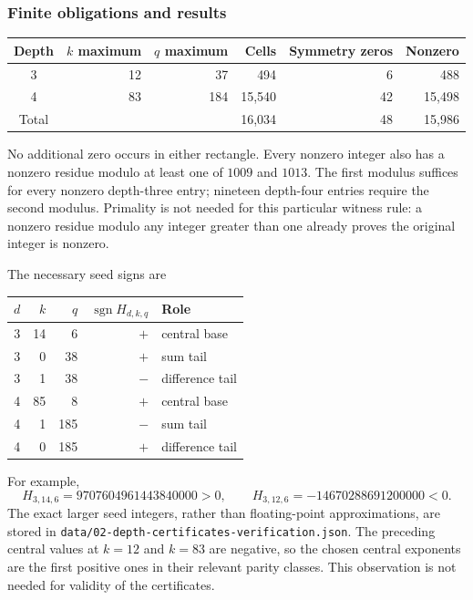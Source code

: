 \documentclass[11pt,a4paper]{article}
\numberwithin{equation}{section}
\theoremstyle{definition}
\theoremstyle{remark}
\theoremstyle{plain}
\DeclareMathOperator{\sgn}{sgn}
\begin{document}
\subsubsection{Finite obligations and results}
\begin{center}
\begin{tabular}{crrrrr}
\toprule
Depth & $k$ maximum & $q$ maximum & Cells & Symmetry zeros & Nonzero\\
\midrule
3 & 12 & 37 & 494 & 6 & 488\\
4 & 83 & 184 & 15,540 & 42 & 15,498\\
\midrule
Total &&&16,034&48&15,986\\
\bottomrule
\end{tabular}
\end{center}
No additional zero occurs in either rectangle.  Every nonzero integer
also has a nonzero residue modulo at least one of $1009$ and $1013$.
The first modulus suffices for every nonzero depth-three entry; nineteen
depth-four entries require the second modulus.  Primality is not needed
for this particular witness rule: a nonzero residue modulo any integer
greater than one already proves the original integer is nonzero.

The necessary seed signs are
\begin{center}
\begin{tabular}{crrrl}
\toprule
$d$ & $k$ & $q$ & $\sgn H_{d,k,q}$ & Role\\
\midrule
3&14&6&$+$&central base\\
3&0&38&$+$&sum tail\\
3&1&38&$-$&difference tail\\
4&85&8&$+$&central base\\
4&1&185&$-$&sum tail\\
4&0&185&$+$&difference tail\\
\bottomrule
\end{tabular}
\end{center}
For example,
\[
 H_{3,14,6}=9707604961443840000>0,
 \qquad H_{3,12,6}=-14670288691200000<0.
\]
The exact larger seed integers, rather than floating-point
approximations, are stored in
\texttt{data/02-depth-\allowbreak certificates-\allowbreak verification.json}.
The preceding central values at $k=12$ and $k=83$ are negative, so the
chosen central exponents are the first positive ones in their relevant
parity classes.  This observation is not needed for validity of the
certificates.
\end{document}
